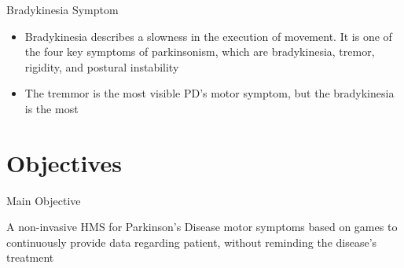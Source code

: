 \documentclass{beamer}
\begin{document}
\begin{frame}{Bradykinesia Symptom}
  \begin{block}{}
      \begin{itemize}
				\item Bradykinesia describes a slowness in the execution of movement. It is one of the four key symptoms of parkinsonism, which are bradykinesia, tremor, rigidity, and postural instability
				\item The tremmor is the most visible PD's motor symptom, but the bradykinesia is the most
	\end{itemize}
  \end{block}
\end{frame}
  


\section{Objectives}
\begin{frame}{Main Objective}
		 \begin{block}{}
				A non-invasive HMS for Parkinson's Disease motor symptoms based on games to continuously provide data regarding patient, without reminding the disease's treatment
		 \end{block}
     \begin{block}{}
     \begin{center}		
		
      \end{center}
    \end{block}
\end{frame}

\end{document}
